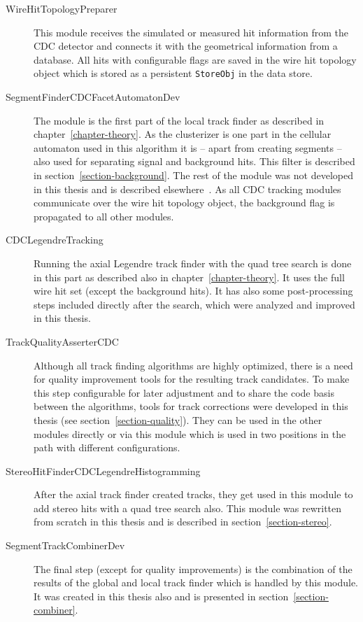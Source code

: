 \begin{description}
  \item[Wire\-Hit\-Topology\-Preparer] This module receives the simulated or measured hit information from the CDC detector and connects it with the geometrical information from a database. All hits with configurable flags are saved in the wire hit topology object which is stored as a persistent \texttt{StoreObj} in the data store.
  \item[Segment\-Finder\-CDC\-Facet\-Automaton\-Dev] The module is the first part of the local track finder as described in chapter~\ref{chapter-theory}. As the clusterizer is one part in the cellular automaton used in this algorithm it is -- apart from creating segments -- also used for separating signal and background hits. This filter is described in section~\ref{section-background}. The rest of the module was not developed in this thesis and is described elsewhere~\cite{oliver}. As all CDC tracking modules communicate over the wire hit topology object, the background flag is propagated to all other modules.
  \item[CDC\-Legendre\-Tracking] Running the axial Legendre track finder with the quad tree search is done in this part as described also in chapter~\ref{chapter-theory}. It uses the full wire hit set (except the background hits). It has also some post-processing steps included directly after the search, which were analyzed and improved in this thesis. 
  \item[Track\-Quality\-Asserter\-CDC] Although all track finding algorithms are highly optimized, there is a need for quality improvement tools for the resulting track candidates. To make this step configurable for later adjustment and to share the code basis between the algorithms, tools for track corrections were developed in this thesis (see section~\ref{section-quality}). They can be used in the other modules directly or via this module which is used in two positions in the path with different configurations.
  \item[Stereo\-Hit\-Finder\-CDC\-Legendre\-Histogramming] After the axial track finder created tracks, they get used in this module to add stereo hits with a quad tree search also. This module was rewritten from scratch in this thesis and is described in section~\ref{section-stereo}.
  \item[Segment\-Track\-Combiner\-Dev] The final step (except for quality improvements) is the combination of the results of the global and local track finder which is handled by this module. It was created in this thesis also and is presented in section~\ref{section-combiner}.
\end{description}

